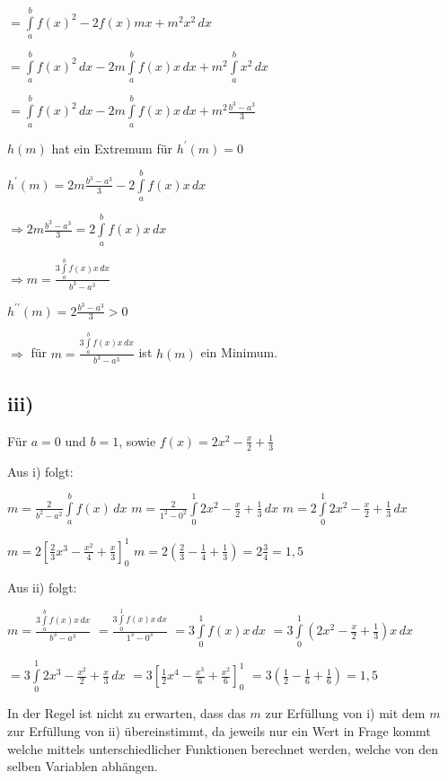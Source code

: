 $ = \int\limits_{a}^{b}f(x)^{2}-2f(x)mx+m^{2}x^{2}\,dx$

$ = \int\limits_{a}^{b}f(x)^{2}\,dx 
-2m\int\limits_{a}^{b}f(x)x\,dx 
+ m^{2}\int\limits_{a}^{b}x^{2}\,dx$

$ = \int\limits_{a}^{b}f(x)^{2}\,dx 
-2m\int\limits_{a}^{b}f(x)x\,dx 
+ m^{2}\frac{b^{3}-a^{3}}{3}$

$h(m)$ hat ein Extremum für $h^{\prime}(m) = 0$

$ h^{\prime}(m) = 2m\frac{b^{3}-a^{3}}{3} - 2\int\limits_{a}^{b}f(x)x\,dx $

$\Rightarrow 2m\frac{b^{3}-a^{3}}{3} =  2\int\limits_{a}^{b}f(x)x\,dx $

$\Rightarrow m =  \frac{3\int\limits_{a}^{b}f(x)x\,dx}{b^{3}-a^{3}} $

$h^{\prime\prime}(m) = 2\frac{b^{3}-a^{3}}{3} > 0$

$\Rightarrow$ für $m = \frac{3\int\limits_{a}^{b}f(x)x\,dx}{b^{3}-a^{3}}$ ist $h(m)$
ein Minimum.


\subsection*{iii)}

Für $a = 0$ und $b = 1$, sowie $f(x) = 2x^{2}-\frac{x}{2} + \frac{1}{3}$ 

Aus i) folgt:

$m = \frac{2}{b^{2}-a^{2}} \int\limits_{a}^{b}f(x) \,dx $
$m = \frac{2}{1^{2}-0^{2}} \int\limits_{0}^{1}2x^{2}-\frac{x}{2} + \frac{1}{3} \,dx$
$m = 2 \int\limits_{0}^{1}2x^{2}-\frac{x}{2} + \frac{1}{3} \,dx $

$m = 2 \left[\frac{2}{3}x^{3} - \frac{x^{2}}{4} + \frac{x}{3}\right]_{0}^{1} $
$m = 2 (\frac{2}{3} - \frac{1}{4} + \frac{1}{3}) = 2 \frac{3}{4} = 1,5 $




Aus ii) folgt:

$m = \frac{3\int\limits_{a}^{b}f(x)x\,dx}{b^{3}-a^{3}} $
$ = \frac{3\int\limits_{0}^{1}f(x)x\,dx}{1^{3}-0^{3}} $
$ = 3\int\limits_{0}^{1}f(x)x\,dx$
$ = 3\int\limits_{0}^{1}(2x^{2}-\frac{x}{2} + \frac{1}{3})x\,dx  $

$ = 3\int\limits_{0}^{1}2x^{3}-\frac{x^{2}}{2} + \frac{x}{3}\,dx  $
$ = 3 \left[\frac{1}{2}x^{4}-\frac{x^{3}}{6} + \frac{x^{2}}{6}\right]^{1}_{0} $
$ = 3 (\frac{1}{2}-\frac{1}{6} + \frac{1}{6}) = 1,5$


In der Regel ist nicht zu erwarten, dass das $m$ zur Erfüllung von i) mit dem $m$ zur Erfüllung von ii) übereinstimmt, da jeweils nur ein Wert in Frage kommt welche mittels unterschiedlicher Funktionen berechnet werden, welche von den selben Variablen abhängen.
